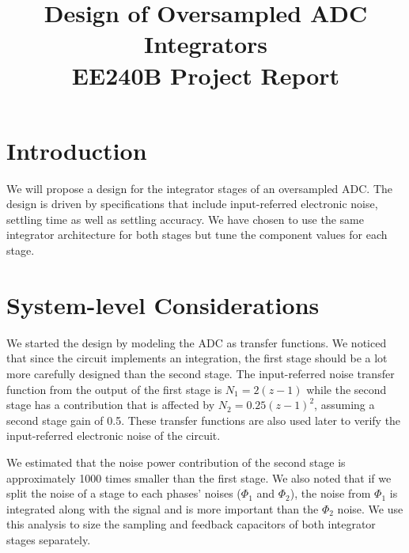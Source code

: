 \documentclass[conference]{IEEEtran}
\begin{document}
\title{Design of Oversampled ADC Integrators \\ \Large EE240B Project Report}
\author{
\and
{}
}
\maketitle

\section{Introduction}

We will propose a design for the integrator stages of an oversampled ADC. The design is driven by specifications that include input-referred electronic noise, settling time as well as settling accuracy. We have chosen to use the same integrator architecture for both stages but tune the component values for each stage.\\

\section{System-level Considerations}

We started the design by modeling the ADC as transfer functions. We noticed that since the circuit implements an integration, the first stage should be a lot more carefully designed than the second stage. The input-referred noise transfer function from the output of the first stage is $N_1 = 2(z-1)$ while the second stage has a contribution that is affected by $N_2 = 0.25(z-1)^2$, assuming a second stage gain of 0.5. These transfer functions are also used later to verify the input-referred electronic noise of the circuit.

We estimated that the noise power contribution of the second stage is approximately 1000 times smaller than the first stage. We also noted that if we split the noise of a stage to each phases' noises ($\Phi_1$ and $\Phi_2$), the noise from $\Phi_1$ is integrated along with the signal and is more important than the $\Phi_2$ noise. We use this analysis to size the sampling and feedback capacitors of both integrator stages separately.\\
\end{document}

